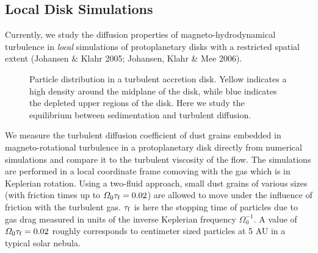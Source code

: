 \subsection{Local Disk Simulations}
%
Currently, we study the diffusion properties of magneto-hydrodynamical
turbulence in {\it local} simulations of protoplanetary disks with a
restricted spatial extent (Johansen \& Klahr 2005; Johansen, Klahr \& Mee
2006).
\begin{figure}
\caption{Particle distribution in a turbulent accretion disk. Yellow indicates
a high density around the midplane of the disk, while blue indicates the
depleted upper regions of the disk.  Here we study the equilibrium between
sedimentation and turbulent diffusion.}
\label{fig:c1_1}
\end{figure}
We measure the turbulent diffusion coefficient of dust grains embedded in
magneto-rotational turbulence in a protoplanetary disk directly from
numerical simulations and compare it to the turbulent viscosity of the
flow. The simulations are performed in a local coordinate frame comoving
with the gas which is in Keplerian rotation. Using a two-fluid approach,
small dust grains of various sizes (with friction times up to $\varOmega_0
\tau_{\rm f}=0.02$) are allowed to move under the influence of friction with
the turbulent gas. $\tau_{\rm f}$ is here the stopping time of particles due
to gas drag measured in units of the inverse Keplerian frequency
$\varOmega_0^{-1}$.  A value of $\varOmega_0 \tau_{\rm f}=0.02$ roughly
corresponds to centimeter sized particles at 5 AU in a typical solar nebula.

